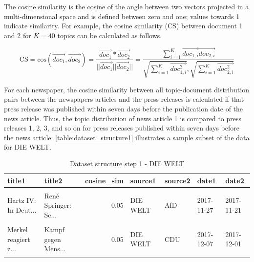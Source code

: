 \documentclass[
  12pt,
]{article}
\begin{document}
The cosine similarity is the cosine of the angle between two vectors
projected in a multi-dimensional space and is defined between zero and
one; values towards 1 indicate similarity. For example, the cosine
similarity (CS) between document 1 and 2 for \(K=40\) topics can be
calculated as follows.

\[
\text{CS} = \text{cos}(\vec{doc_1},\vec{doc_2})=\frac{\vec{doc_1}*\vec{doc_2}}{||\vec{doc_1}||\vec{doc_2}||}=\frac{\sum^K_{i=1} \vec{doc_{1,i}}\vec{doc_{2,i}}}{\sqrt{\sum^K_{i=1} \vec{doc^2_{1,i}}}, \sqrt{\sum^K_{i=1}\vec{doc^2_{2,i}}}}
\]

For each newspaper, the cosine similarity between all topic-document
distribution pairs between the newspapers articles and the press
releases is calculated if that press release was published within seven
days before the publication date of the news article. Thus, the topic
distribution of news article 1 is compared to press releases 1, 2, 3,
and so on for press releases published within seven days before the news
article. \autoref{table:dataset_structure1} illustrates a sample subset
of the data for DIE WELT.

\begin{table}[H]

\caption{\label{tab:Dataset structure 1}Dataset structure step 1 - DIE WELT \label{table:dataset_structure1}}
\centering
\fontsize{7}{9}\selectfont
\begin{tabular}[t]{llrllll}
\toprule
title1 & title2 & cosine\_sim & source1 & source2 & date1 & date2\\
\midrule
\cellcolor{gray!6}{Wolfgang Schäuble...} & \cellcolor{gray!6}{Keine gemeinsame...} & \cellcolor{gray!6}{0.87} & \cellcolor{gray!6}{DIE WELT} & \cellcolor{gray!6}{FDP} & \cellcolor{gray!6}{2018-01-18} & \cellcolor{gray!6}{2018-01-17}\\
Hartz IV: In Deut... & René Springer: Sc... & 0.05 & DIE WELT & AfD & 2017-11-27 & 2017-11-21\\
\cellcolor{gray!6}{SPD-Parteitag: So...} & \cellcolor{gray!6}{Holocaust nicht l...} & \cellcolor{gray!6}{0.05} & \cellcolor{gray!6}{DIE WELT} & \cellcolor{gray!6}{DIE LINKE} & \cellcolor{gray!6}{2018-01-21} & \cellcolor{gray!6}{2018-01-18}\\
Merkel reagiert z... & Kampf gegen Mens... & 0.05 & DIE WELT & CDU & 2017-12-07 & 2017-12-01\\
\cellcolor{gray!6}{Behördenpanne: Zu...} & \cellcolor{gray!6}{Martin Hess: Fußf...} & \cellcolor{gray!6}{0.05} & \cellcolor{gray!6}{DIE WELT} & \cellcolor{gray!6}{AfD} & \cellcolor{gray!6}{2017-11-18} & \cellcolor{gray!6}{2017-11-17}\\
\bottomrule
\end{tabular}
\end{table}
\end{document}

